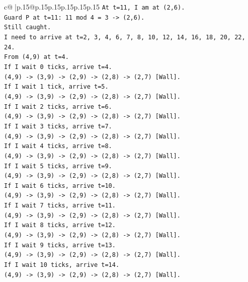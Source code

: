 \documentclass{article}
\begin{document}
{\begin{supertabular}{c@{$\;$}|p{.15\linewidth}@{}p{.15\linewidth}p{.15\linewidth}p{.15\linewidth}p{.15\linewidth}p{.15\linewidth}}
{{{\texttt{At t=11, I am at (2,6).} \\
\texttt{Guard P at t=11: 11 mod 4 = 3 {-}> (2,6).} \\
\texttt{Still caught.} \\
\texttt{I need to arrive at t=2, 3, 4, 6, 7, 8, 10, 12, 14, 16, 18, 20, 22, 24.} \\
\texttt{From (4,9) at t=4.} \\
\texttt{If I wait 0 ticks, arrive t=4.} \\
\texttt{(4,9) {-}> (3,9) {-}> (2,9) {-}> (2,8) {-}> (2,7) {[}Wall{]}.} \\
\texttt{If I wait 1 tick, arrive t=5.} \\
\texttt{(4,9) {-}> (3,9) {-}> (2,9) {-}> (2,8) {-}> (2,7) {[}Wall{]}.} \\
\texttt{If I wait 2 ticks, arrive t=6.} \\
\texttt{(4,9) {-}> (3,9) {-}> (2,9) {-}> (2,8) {-}> (2,7) {[}Wall{]}.} \\
\texttt{If I wait 3 ticks, arrive t=7.} \\
\texttt{(4,9) {-}> (3,9) {-}> (2,9) {-}> (2,8) {-}> (2,7) {[}Wall{]}.} \\
\texttt{If I wait 4 ticks, arrive t=8.} \\
\texttt{(4,9) {-}> (3,9) {-}> (2,9) {-}> (2,8) {-}> (2,7) {[}Wall{]}.} \\
\texttt{If I wait 5 ticks, arrive t=9.} \\
\texttt{(4,9) {-}> (3,9) {-}> (2,9) {-}> (2,8) {-}> (2,7) {[}Wall{]}.} \\
\texttt{If I wait 6 ticks, arrive t=10.} \\
\texttt{(4,9) {-}> (3,9) {-}> (2,9) {-}> (2,8) {-}> (2,7) {[}Wall{]}.} \\
\texttt{If I wait 7 ticks, arrive t=11.} \\
\texttt{(4,9) {-}> (3,9) {-}> (2,9) {-}> (2,8) {-}> (2,7) {[}Wall{]}.} \\
\texttt{If I wait 8 ticks, arrive t=12.} \\
\texttt{(4,9) {-}> (3,9) {-}> (2,9) {-}> (2,8) {-}> (2,7) {[}Wall{]}.} \\
\texttt{If I wait 9 ticks, arrive t=13.} \\
\texttt{(4,9) {-}> (3,9) {-}> (2,9) {-}> (2,8) {-}> (2,7) {[}Wall{]}.} \\
\texttt{If I wait 10 ticks, arrive t=14.} \\
\texttt{(4,9) {-}> (3,9) {-}> (2,9) {-}> (2,8) {-}> (2,7) {[}Wall{]}.} \\
}}}
\end{supertabular}}
\end{document}
